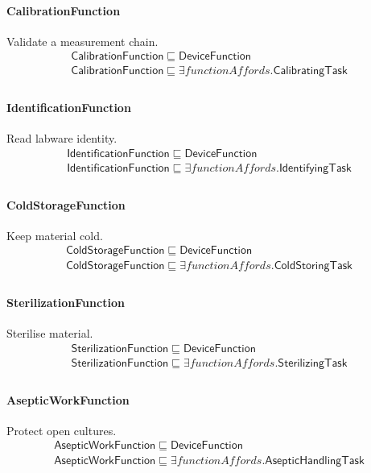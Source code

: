 \documentclass[10pt]{article}
\begin{document}
\paragraph{CalibrationFunction} Validate a measurement chain.
\[\begin{array}{l}
\mathsf{CalibrationFunction} \sqsubseteq  \mathsf{DeviceFunction} \\
\mathsf{CalibrationFunction} \sqsubseteq  \exists \mathit{functionAffords}.\mathsf{CalibratingTask} \\
\end{array}\]
\paragraph{IdentificationFunction} Read labware identity.
\[\begin{array}{l}
\mathsf{IdentificationFunction} \sqsubseteq  \mathsf{DeviceFunction} \\
\mathsf{IdentificationFunction} \sqsubseteq  \exists \mathit{functionAffords}.\mathsf{IdentifyingTask} \\
\end{array}\]
\paragraph{ColdStorageFunction} Keep material cold.
\[\begin{array}{l}
\mathsf{ColdStorageFunction} \sqsubseteq  \mathsf{DeviceFunction} \\
\mathsf{ColdStorageFunction} \sqsubseteq  \exists \mathit{functionAffords}.\mathsf{ColdStoringTask} \\
\end{array}\]
\paragraph{SterilizationFunction} Sterilise material.
\[\begin{array}{l}
\mathsf{SterilizationFunction} \sqsubseteq  \mathsf{DeviceFunction} \\
\mathsf{SterilizationFunction} \sqsubseteq  \exists \mathit{functionAffords}.\mathsf{SterilizingTask} \\
\end{array}\]
\paragraph{AsepticWorkFunction} Protect open cultures.
\[\begin{array}{l}
\mathsf{AsepticWorkFunction} \sqsubseteq  \mathsf{DeviceFunction} \\
\mathsf{AsepticWorkFunction} \sqsubseteq  \exists \mathit{functionAffords}.\mathsf{AsepticHandlingTask} \\
\end{array}\]
\end{document}
